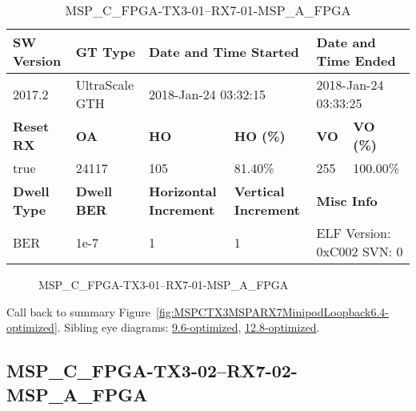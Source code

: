 \begin{table}[h]
\centering
\caption{MSP\_C\_FPGA-TX3-01--RX7-01-MSP\_A\_FPGA}
\label{tab:MSPCFPGATX301RX701MSPAFPGA6.4-optimized}
\begin{tabular}{@{}|l|l|l|l|l|l|@{}}
\toprule
\textbf{SW Version}                & \textbf{GT Type}   & \multicolumn{2}{l|}{\textbf{Date and Time Started}}            & \multicolumn{2}{l|}{\textbf{Date and Time Ended}}        \\ \midrule
2017.2                       & UltraScale GTH          & \multicolumn{2}{l|}{2018-Jan-24 03:32:15}                   & \multicolumn{2}{l|}{2018-Jan-24 03:33:25}               \\ \midrule
\textbf{Reset RX}                  & \textbf{OA} & \textbf{HO}   & \textbf{HO (\%)} & \textbf{VO} & \textbf{VO (\%)} \\ \midrule
true & 24117        & 105          & 81.40\%        & 255        & 100.00\%       \\ \midrule
\textbf{Dwell Type}                & \textbf{Dwell BER} & \textbf{Horizontal Increment} & \textbf{Vertical Increment}    & \multicolumn{2}{l|}{\textbf{Misc Info}}                  \\ \midrule
BER                            & 1e-7        & 1        & 1           & \multicolumn{2}{l|}{ELF Version: 0xC002 SVN: 0}                         \\ \bottomrule
\end{tabular}
\end{table}

\begin{figure}[h]
\caption{MSP\_C\_FPGA-TX3-01--RX7-01-MSP\_A\_FPGA} \label{fig:MSPCFPGATX301RX701MSPAFPGA6.4-optimized}
\end{figure}

Call back to summary Figure~\ref{fig:MSPCTX3MSPARX7MinipodLoopback6.4-optimized}.
Sibling eye diagrams: \hyperref[sec:MSPCFPGATX301RX701MSPAFPGA9.6-optimized]{9.6-optimized}, \hyperref[sec:MSPCFPGATX301RX701MSPAFPGA12.8-optimized]{12.8-optimized}.

\clearpage
\newpage


\subsection{MSP\_C\_FPGA-TX3-02--RX7-02-MSP\_A\_FPGA}\label{sec:MSPCFPGATX302RX702MSPAFPGA6.4-optimized}

